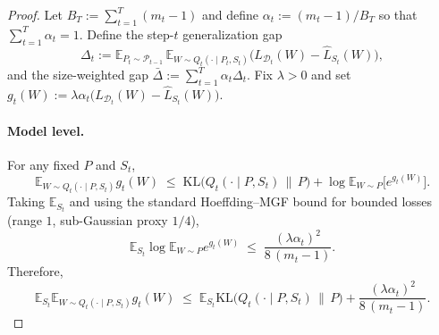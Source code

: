 \documentclass{article} %
\begin{document}
\begin{proof}
    


Let $B_T:=\sum_{t=1}^T (m_t-1)$ and define $\alpha_t:=(m_t-1)/B_T$ so that $\sum_{t=1}^T\alpha_t=1$.
Define the step-$t$ generalization gap
\[
\Delta_t
:=\mathbb E_{P_t\sim\mathcal P_{t-1}}\,
\mathbb E_{W\sim Q_t(\cdot\mid P_t,S_t)}
\big(L_{\mathcal D_t}(W)-\hat L_{S_t}(W)\big),
\]
and the size-weighted gap $\bar\Delta:=\sum_{t=1}^T \alpha_t \Delta_t$.
Fix $\lambda>0$ and set
\(
g_t(W):=\lambda\alpha_t\big(L_{\mathcal D_t}(W)-\hat L_{S_t}(W)\big).
\)

\paragraph{Model level.}
For any fixed $P$ and $S_t$,
\begin{equation}
\label{eq:dv-w}
\mathbb E_{W\sim Q_t(\cdot\mid P,S_t)} g_t(W)
\;\le\;
\mathrm{KL}\!\big(Q_t(\cdot\mid P,S_t)\,\|\,P\big)
+\log\mathbb E_{W\sim P}\!\big[e^{g_t(W)}\big].
\end{equation}
Taking $\mathbb E_{S_t}$ and using the standard Hoeffding--MGF bound for bounded losses (range $1$, sub-Gaussian proxy $1/4$),
\begin{equation}
\label{eq:mgf-mean-gap}
\mathbb E_{S_t}\log\mathbb E_{W\sim P} e^{g_t(W)}
\;\le\; \frac{(\lambda\alpha_t)^2}{8\,(m_t-1)}.
\end{equation}
Therefore,
\begin{equation}
\label{eq:model-step}
\mathbb E_{S_t}\mathbb E_{W\sim Q_t(\cdot\mid P,S_t)} g_t(W)
\;\le\;
\mathbb E_{S_t}\mathrm{KL}\!\big(Q_t(\cdot\mid P,S_t)\,\|\,P\big)
+\frac{(\lambda\alpha_t)^2}{8\,(m_t-1)}.
\end{equation}

\end{proof}
\end{document}
